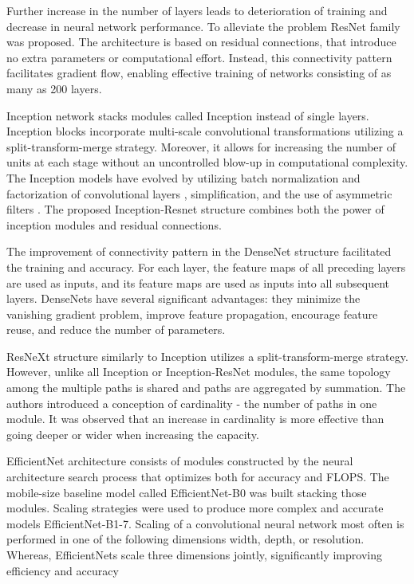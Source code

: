 \documentclass{article}
\begin{document}
Further increase in the number of layers leads to deterioration of training and decrease in neural network performance. To alleviate the problem ResNet family \cite{resnet50} was proposed. The architecture is based on residual connections, that introduce no extra parameters or computational effort. Instead, this connectivity pattern facilitates gradient flow, enabling effective training of networks consisting of as many as 200 layers.


Inception \cite{43022} network stacks modules called Inception instead of single layers. Inception blocks incorporate multi-scale convolutional transformations utilizing a split-transform-merge strategy. Moreover, it allows for increasing the number of units at each stage without an uncontrolled blow-up in computational complexity. The Inception models have evolved by utilizing batch normalization and factorization of convolutional layers \cite{44903}, simplification, and the use of asymmetric filters \cite{10.5555/3298023.3298188}. The proposed Inception-Resnet structure \cite{10.5555/3298023.3298188} combines both the power of inception modules and residual connections.


The improvement of connectivity pattern in the DenseNet structure \cite{8099726} facilitated the training and accuracy. For each layer, the feature maps of all preceding layers are used as inputs, and its feature maps are used as inputs into all subsequent layers. DenseNets have several significant advantages: they minimize the vanishing gradient problem, improve feature propagation, encourage feature reuse, and reduce the number of parameters.


ResNeXt \cite{8100117} structure similarly to Inception utilizes a split-transform-merge strategy. However, unlike all Inception or Inception-ResNet modules, the same topology among the multiple paths is shared and paths are aggregated by summation. The authors introduced a conception of cardinality - the number of paths in one module. It was observed that an increase in cardinality is more effective than going deeper or wider when increasing the capacity.


EfficientNet \cite{efficientnet2019} architecture consists of modules constructed by the neural architecture search process that optimizes both for accuracy and FLOPS. The mobile-size baseline model called EfficientNet-B0 was built stacking those modules. Scaling strategies were used to produce more complex and accurate models EfficientNet-B1-7. Scaling of a convolutional neural network most often is performed in one of the following dimensions width, depth, or resolution. Whereas, EfficientNets scale three dimensions jointly, significantly improving efficiency and accuracy
\end{document}

